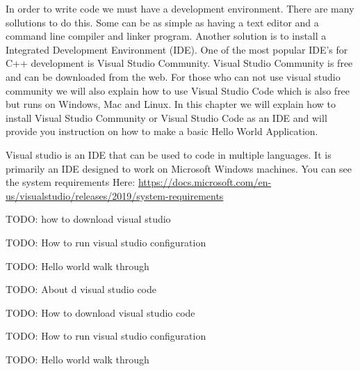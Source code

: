 

In order to write code we must have a development environment. There are many sollutions to do this. 
Some can be as simple as having a text editor and a command line compiler and linker program. 
Another solution is to install a Integrated Development Environment (IDE). 
One of the most popular IDE's for C++ development is Visual Studio Community. 
Visual Studio Community is free and can be downloaded from the web. 
For those who can not use visual studio community we will also explain how to use Visual Studio Code
 which is also free but runs on Windows, Mac and Linux. In this chapter we will explain how to install 
 Visual Studio Community or Visual Studio Code as an IDE and will provide you instruction on how to 
 make a basic Hello World Application.

Visual studio is an IDE that can be used to code in multiple languages. It is primarily an IDE designed
to work on Microsoft Windows machines. You can see the system requirements Here:  
\url{https://docs.microsoft.com/en-us/visualstudio/releases/2019/system-requirements}

TODO: how to download visual studio

TODO: How to run visual studio configuration

TODO: Hello world walk through

TODO: About d visual studio code

TODO: How to download visual studio code

TODO: How to run visual studio configuration

TODO: Hello world walk through
	